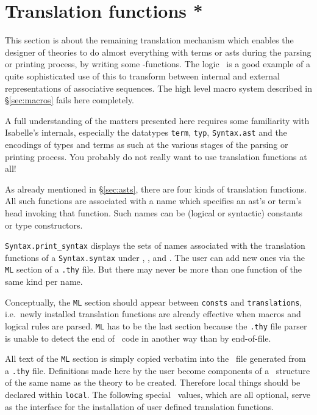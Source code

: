 \section{Translation functions *} \label{sec:tr_funs}

This section is about the remaining translation mechanism which enables the
designer of theories to do almost everything with terms or asts during the
parsing or printing process, by writing some \ML-functions. The logic \LK\ is
a good example of a quite sophisticated use of this to transform between
internal and external representations of associative sequences. The high
level macro system described in \S\ref{sec:macros} fails here completely.

\begin{warn}
A full understanding of the matters presented here requires some familiarity
with Isabelle's internals, especially the datatypes {\tt term}, {\tt typ},
{\tt Syntax.ast} and the encodings of types and terms as such at the various
stages of the parsing or printing process. You probably do not really want to
use translation functions at all!
\end{warn}

As already mentioned in \S\ref{sec:asts}, there are four kinds of translation
functions. All such functions are associated with a name which specifies an
ast's or term's head invoking that function. Such names can be (logical or
syntactic) constants or type constructors.

{\tt Syntax.print_syntax} displays the sets of names associated with the
translation functions of a {\tt Syntax.syntax} under
, ,
 and . The user can
add new ones via the {\tt ML} section of a
{\tt .thy} file. But there may never be more than one function of the same
kind per name.

\begin{warn}
Conceptually, the {\tt ML} section should appear between {\tt consts} and
{\tt translations}, i.e.\ newly installed translation functions are already
effective when macros and logical rules are parsed. {\tt ML} has to be the
last section because the {\tt .thy} file parser is unable to detect the end
of \ML\ code in another way than by end-of-file.
\end{warn}

All text of the {\tt ML} section is simply copied verbatim into the \ML\ file
generated from a {\tt .thy} file. Definitions made here by the user become
components of a \ML\ structure of the same name as the theory to be created.
Therefore local things should be declared within {\tt local}. The following
special \ML\ values, which are all optional, serve as the interface for the
installation of user defined translation functions.


